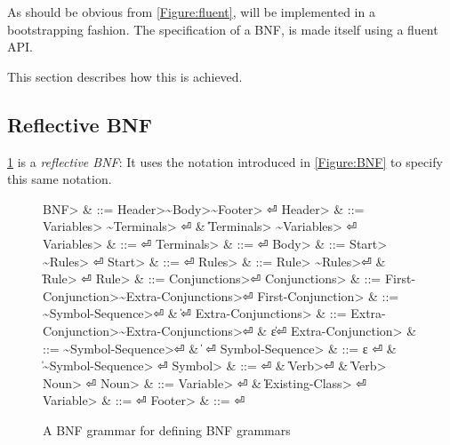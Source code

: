 As should be obvious from \cref{Figure:fluent}, \Self will be implemented
  in a bootstrapping fashion.
The specification of a BNF, is made itself using a fluent API.

This section describes how this is achieved.

\subsection{Reflective BNF}
\cref{Figure:BNF:BNF} is a \emph{reflective BNF}:
It uses the notation introduced in \cref{Figure:BNF}
  to specify this same notation.

\begin{figure}[H]
  \begin{Grammar}
    \begin{aligned}
      \<BNF>                     & ::= \<Header>\~\<Body>\~\<Footer> \hfill⏎
      \<Header>                  & ::= \<Variables> \~\<Terminals> \hfill⏎
      {}                         & \| \<Terminals> \~\<Variables> \hfill⏎
      \<Variables>               & ::= \hfill⏎
      \<Terminals>               & ::= \hfill⏎
      \<Body>                    & ::= \<Start> \~\<Rules> \hfill⏎
      \<Start>                   & ::=  \hfill⏎
      \<Rules>                   & ::= \<Rule> \~\<Rules>\hfill⏎
      {}                         & \| \<Rule> \hfill⏎
      \<Rule>                    & ::=  \<Conjunctions>\hfill⏎
      \<Conjunctions>            & ::= \<First-Conjunction>\~\<Extra-Conjunctions>\hfill⏎
      \<First-Conjunction>       & ::= \~\<Symbol-Sequence>\hfill⏎
      {}                         & \| \hfill⏎
      \<Extra-Conjunctions> & ::= \<Extra-Conjunction>\~\<Extra-Conjunctions>\hfill⏎
      {}                         & \| ε\hfill⏎
      \<Extra-Conjunction>  & ::= \~\<Symbol-Sequence>\hfill⏎
      {}                         & \|  \hfill⏎
      \<Symbol-Sequence>         & ::= ε \hfill⏎
      {}                         & \| \~\<Symbol-Sequence> \hfill⏎
      \<Symbol>                  & ::=  \hfill⏎
      {}                         & \| \<Verb>\hfill⏎
      {}                         & \| \<Verb> \cc{,} \<Noun> \hfill⏎
      \<Noun>                    & ::= \<Variable> \hfill⏎
      {}                         & \| \<Existing-Class> \hfill⏎
      \<Variable>                & ::=  \hfill⏎
      \<Footer>                  & ::= \hfill⏎
    \end{aligned}
  \end{Grammar}
  \caption{A BNF grammar for defining BNF grammars}
  \label{Figure:BNF:BNF}
\end{figure}
\begin{comment}
Note that this specification can only be approximate;
the figure uses verbs as replacement to indentation,
and special symbols such as~$|$,~$::-$ and~$ε$.
\end{comment}

